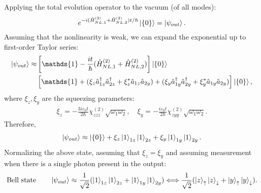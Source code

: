 Applying the total evolution operator to the vacuum (of all modes):
\begin{align*}
    e^{-i(\hat{H}_{NL,1}^{(2)}+\hat{H}_{NL,2}^{(2)})t/\hbar}\left|\{0\}\right\rangle=\left|\psi_{out}\right\rangle.
\end{align*}
Assuming that the nonlinearity is weak, we can expand the exponential up to first-order Taylor series:
\begin{align*}
    \ket{\psi_{out}}\approx&\left[\mathds{1}-\frac{it}{\hbar}(\hH_{NL,1}^{(2)}+\hH_{NL,2}^{(2)})\right]\ket{\{0\}}\\
    &\left[\mathds{1}+(\xi_z\ha_{1z}^\dagger\ha_{2z}^\dagger+\xi_z^*\ha_{1z}\ha_{2y})+(\xi_y\ha_{1y}^\dagger\ha_{2y}^\dagger+\xi_y^*\ha_{1y}\ha_{2y})\right]\ket{\{0\}},
\end{align*}
where $\xi_z,\xi_y$ are the squeezing parameters:
\begin{align*}
    \xi_z=-\frac{3i\varepsilon_0t}{2\hbar}\chi_{zzz}^{(2)}\sqrt{\omega_1\omega_2},\quad\xi_y=-\frac{i\varepsilon_0t}{2\hbar}\chi_{zyy}^{(2)}\sqrt{\omega_1\omega_2}.
\end{align*}
Therefore,
\begin{align*}
    \left|\psi_{out}\right\rangle\approx\left|\{0\}\right\rangle+\xi_z\left|1\right\rangle_{1z}\left|1\right\rangle_{2z}+\xi_y\left|1\right\rangle_{1y}\left|1\right\rangle_{2y}.
\end{align*}
Normalizing the above state, assuming that $\xi_z=\xi_y$ and assuming measurement when there is a single photon present in the output:
\begin{align}
    \text{Bell state}\qquad\left|\psi_{out}\right\rangle\approx\frac{1}{\sqrt{2}}(\left|1\right\rangle_{1z}\left|1\right\rangle_{2z}+\left|1\right\rangle_{1y}\left|1\right\rangle_{2y})\Longleftrightarrow
    \frac{1}{\sqrt{2}}(\left|z\right\rangle_{\uparrow}\left|z\right\rangle_{\downarrow}+\left|y\right\rangle_{\uparrow}\left|y\right\rangle_{\downarrow}).
\end{align}


